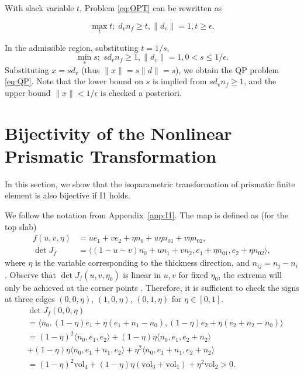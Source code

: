 With slack variable $t$, Problem \ref{eq:OPT} can be rewritten as

$$\max_t t;\; d_v n_f \geq t, \|d_v\| = 1, t \geq {\epsilon}.$$

In the admissible region, substituting $t = 1/s$, 
$$\min_s s;\; s d_v n_f \geq 1, \|d_v\| = 1, {0< s \leq 1/\epsilon}.$$
Substituting $x=s d_v$ (thus $\|x\| = s\|d\| = s$), we obtain the QP problem \ref{eq:QP}. Note that the lower bound on $s$ is implied from $s d_v n_f \geq 1$, and the upper bound $\|x\| < 1/\epsilon$ is checked a posteriori.

\section{Bijectivity of the Nonlinear Prismatic Transformation}
\label{app:bilinear}
In this section, we show
that the isoparametric transformation of prismatic finite element \cite{ciarlet1991basic} is also bijective if I1 holds.%

We follow the notation from {Appendix~\ref{app:I1}.} 
The map is defined as (for the top slab)
\begin{align*}
    f(u,v,\eta) &= u e_1 + v e_2  + \eta n_0 + u \eta {n_{01}} +
    v \eta {n_{02}},\\
    \det J_f &=  \langle (1-u-v) n_0 + u n_1 + v n_2, e_1 + \eta {n_{01}},
    e_2 + \eta {n_{02} \rangle,}
\end{align*}
where $\eta$ is the variable corresponding to the thickness direction{, and $n_{ij} = n_j - n_i$.}
Observe that $\det J_f(u,v,\eta_0)$ is linear in $u,v$ for fixed $\eta_0$, the extrema will only be achieved at the corner points \cite{knabner2001invertibility}. Therefore, it is sufficient to check the signs at three edges
$(0,0,\eta)$, $(1,0,\eta)$, $(0,1,\eta)$ for $\eta \in [0,1]$.
\begin{align*}
    & \det J_f(0,0,\eta) \\
    &= \langle n_0, (1-\eta)e_1 +\eta (e_1 + n_1 - n_0),(1-\eta)e_2 +\eta (e_2 + n_2 - n_0) \rangle \\
    &= (1-\eta)^2\langle n_0, e_1, e_2 \rangle + 
    (1-\eta)\eta \langle n_0,e_1, e_2+n_2\rangle \\&+ 
    (1-\eta)\eta \langle n_0, e_1+n_1, e_2\rangle + 
    \eta^2\langle n_0, e_1+n_1, e_2 + n_2\rangle\\
    &= (1-\eta)^2 \text{vol}_4 + (1-\eta)\eta (\text{vol}_3 +\text{vol}_1) + \eta^2 \text{vol}_2 > 0.
\end{align*}

